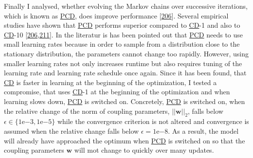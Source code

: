 \documentclass[11pt,a4paper,twoside]{book}
\newcommand{\eq}{\!=\!}
\newcommand{\w}{\mathbf{w}}
\theoremstyle{definition}
\theoremstyle{definition}
\theoremstyle{remark}
\begin{document}
Finally I analysed, whether evolving the Markov chains over successive
iterations, which is known as \protect\hyperlink{abbrev}{PCD}, does
improve performance {[}\protect\hyperlink{ref-Tieleman2008}{206}{]}.
Several empirical studies have shown that
\protect\hyperlink{abbrev}{PCD} performs superior compared to
\protect\hyperlink{abbrev}{CD}-1 and also to
\protect\hyperlink{abbrev}{CD}-10
{[}\protect\hyperlink{ref-Tieleman2008}{206},\protect\hyperlink{ref-Swersky2010}{211}{]}.
In the literatur is has been pointed out that
\protect\hyperlink{abbrev}{PCD} needs to use small learning rates
because in order to sample from a distribution close to the stationary
distribution, the parameters cannot change too rapidly. However, using
smaller learning rates not only increases runtime but also requires
tuning of the learning rate and learning rate schedule once again. Since
it has been found, that \protect\hyperlink{abbrev}{CD} is faster in
learning at the beginning of the optimization, I tested a compromise,
that uses \protect\hyperlink{abbrev}{CD}-1 at the beginning of the
optimization and when learning slows down,
\protect\hyperlink{abbrev}{PCD} is switched on. Concretely,
\protect\hyperlink{abbrev}{PCD} is switched on, when the relative change
of the norm of coupling parameters, \(||\w||_2\), falls below
\(\epsilon \in \{\mathrm{1e}{-3}, \mathrm{1e}{-5}\}\) while the
convergence criterion is not altered and convergence is assumed when the
relative change falls below \(\epsilon \eq \mathrm{1e}{-8}\). As a
result, the model will already have approached the optimum when
\protect\hyperlink{abbrev}{PCD} is switched on so that the coupling
parameters \(\w\) will mot change to quickly over many updates.
\end{document}
